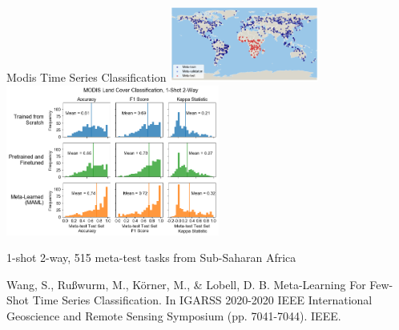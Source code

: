 \documentclass[11pt]{beamer}
\newcommand{\citeapa}[1]{ {\tiny#1\par} }
\begin{document}
	\begin{frame}{Modis Time Series Classification}
		\centering
				\includegraphics[height=2.5cm]{igarss2020/modis_task_map}
				\includegraphics[width=7cm]{igarss2020/modis_africa_histograms_narrow}
				
		1-shot 2-way, 515 meta-test tasks from Sub-Saharan  Africa

		\citeapa{Wang, S., Rußwurm, M., Körner, M., \& Lobell, D. B. Meta-Learning For Few-Shot Time Series Classification. In IGARSS 2020-2020 IEEE International Geoscience and Remote Sensing Symposium (pp. 7041-7044). IEEE.}
	\end{frame}
\end{document}
